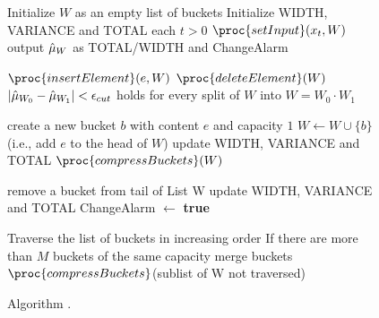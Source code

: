 \begin{figure}

\centering

\begin{codebox}
\li Initialize $W$ as an empty list of buckets
\li Initialize WIDTH, VARIANCE and TOTAL
\li \For each $t >0$ %
\li \Do $\proc{setInput}( x_t, W)$ %
\li output $\hat{\mu}_{W}$ as TOTAL/WIDTH and ChangeAlarm %

\end{codebox}

\begin{codebox}
\li  $\proc{insertElement}(e,W)$
\li \Repeat $\proc{deleteElement}(W)$ 
\li \Until $|\hat{\mu}_{W_0}-\hat{\mu}_{W_1}|  < \epsilon_{cut}$ holds %
\li \quad\quad for every split of $W$ into $W=W_0 \cdot W_1$ 
\end{codebox}

\begin{codebox}
\li create a new bucket $b$ with content $e$ and capacity $1$
\li $W \gets W \cup \{b\}$ (i.e., add $e$ to the head of $W$)
\li update WIDTH, VARIANCE and TOTAL
\li $\proc{compressBuckets}(W)$
\end{codebox}

\begin{codebox}
\li remove a bucket from tail of List W
\li update WIDTH, VARIANCE and TOTAL
\li ChangeAlarm $ \gets $ {\bf true}	
\end{codebox}

\begin{codebox}
 \li   Traverse the list of buckets in increasing order
 \li    \Do If there are more than $M$ buckets of the same capacity %
\li      \Do merge buckets 	
 \li    $\proc{compressBuckets}$(sublist of W not traversed)
\end{codebox}

\caption{Algorithm \adwintwoz.}\label{blnAdwin2}
\end{figure}


